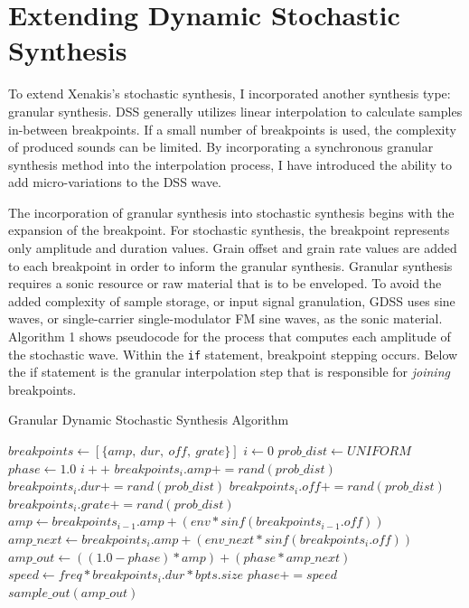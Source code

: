 \documentclass[10pt]{article}
\begin{document}
\section{Extending Dynamic Stochastic Synthesis}
To extend Xenakis's stochastic synthesis, I incorporated another synthesis type: granular synthesis. DSS generally utilizes linear interpolation to calculate samples in-between breakpoints. If a small number of breakpoints is used, the complexity of produced sounds can be limited. By incorporating a synchronous granular synthesis method into the interpolation process, I have introduced the ability to add micro-variations to the DSS wave. 

The incorporation of granular synthesis into stochastic synthesis begins with the expansion of the breakpoint. For stochastic synthesis, the breakpoint represents only amplitude and duration values. Grain offset and grain rate values are added to each breakpoint in order to inform the granular synthesis. Granular synthesis requires a sonic resource or raw material that is to be enveloped. To avoid the added complexity of sample storage, or input signal granulation, GDSS uses sine waves, or single-carrier single-modulator FM sine waves, as the sonic material. Algorithm 1 shows pseudocode for the process that computes each amplitude of the stochastic wave. Within the \texttt{if} statement, breakpoint stepping occurs. Below the if statement is the granular interpolation step that is responsible for \textit{joining} breakpoints.

\begin{algorithm}
\caption{Granular Dynamic Stochastic Synthesis Algorithm}
    \begin{algorithmic}
        \STATE $breakpoints\gets [\{amp,\ dur,\ off,\ grate\}]$
        \STATE $i\gets 0$
        \STATE $prob\_dist\gets UNIFORM$
        \STATE $phase\gets1.0$
        \LOOP
                \STATE $i++$
                \STATE $breakpoints_{i}.amp += rand(prob\_dist)$
                \STATE $breakpoints_{i}.dur += rand(prob\_dist)$
                \STATE $breakpoints_{i}.off += rand(prob\_dist)$
                \STATE $breakpoints_{i}.grate += rand(prob\_dist)$
            \ENDIF
            \STATE $amp\gets breakpoints_{i-1}.amp + (env * sinf(breakpoints_{i-1}.off))$
            \STATE $amp\_next\gets breakpoints_{i}.amp + (env\_next * sinf(breakpoints_{i}.off))$
            \STATE $amp\_out\gets ((1.0 - phase) * amp) + (phase * amp\_next)$
            \STATE $speed\gets freq * breakpoints_{i}.dur * bpts.size$
            \STATE $phase += speed$
            \STATE $sample\_out(amp\_out)$
        \ENDLOOP
    \end{algorithmic}
\end{algorithm}
\end{document}
